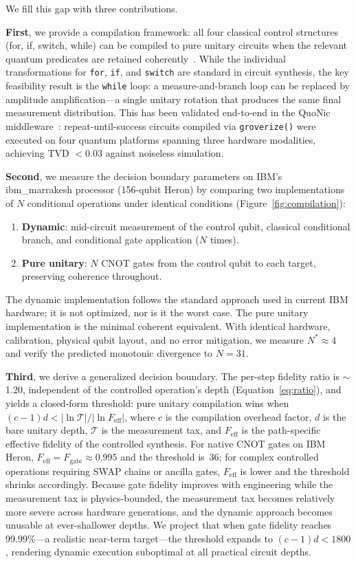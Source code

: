 \documentclass[11pt]{article}
\begin{document}
We fill this gap with three contributions.

\textbf{First}, we provide a compilation framework: all four classical control structures (for, if, switch, while) can be compiled to pure unitary circuits when the relevant quantum predicates are retained coherently~\cite{nielsen2010}.
While the individual transformations for \texttt{for}, \texttt{if}, and \texttt{switch} are standard in circuit synthesis, the key feasibility result is the \texttt{while} loop: a measure-and-branch loop can be replaced by amplitude amplification---a single unitary rotation that produces the same final measurement distribution.
This has been validated end-to-end in the QuoNic middleware~\cite{quonic2026}: repeat-until-success circuits compiled via \texttt{groverize()} were executed on four quantum platforms spanning three hardware modalities, achieving TVD $< 0.03$ against noiseless simulation.

\textbf{Second}, we measure the decision boundary parameters on IBM's ibm\_marrakesh processor (156-qubit Heron) by comparing two implementations of $N$ conditional operations under identical conditions (Figure~\ref{fig:compilation}):
\begin{enumerate}
  \item \textbf{Dynamic}: mid-circuit measurement of the control qubit, classical conditional branch, and conditional gate application ($N$ times).
  \item \textbf{Pure unitary}: $N$ CNOT gates from the control qubit to each target, preserving coherence throughout.
\end{enumerate}
The dynamic implementation follows the standard approach used in current IBM hardware; it is not optimized, nor is it the worst case.
The pure unitary implementation is the minimal coherent equivalent.
With identical hardware, calibration, physical qubit layout, and no error mitigation, we measure $N^* \approx 4$ and verify the predicted monotonic divergence to $N = 31$.

\textbf{Third}, we derive a generalized decision boundary.
The per-step fidelity ratio is $\sim$1.20, independent of the controlled operation's depth (Equation~\ref{eq:ratio}), and yields a closed-form threshold: pure unitary compilation wins when $(c{-}1)d < |\ln\mathcal{T}|/|\ln F_{\text{eff}}|$, where $c$ is the compilation overhead factor, $d$ is the bare unitary depth, $\mathcal{T}$ is the measurement tax, and $F_{\text{eff}}$ is the path-specific effective fidelity of the controlled synthesis.
For native CNOT gates on IBM Heron, $F_{\text{eff}} = F_{\text{gate}} \approx 0.995$ and the threshold is~36; for complex controlled operations requiring SWAP chains or ancilla gates, $F_{\text{eff}}$ is lower and the threshold shrinks accordingly.
Because gate fidelity improves with engineering while the measurement tax is physics-bounded, the measurement tax becomes relatively more severe across hardware generations, and the dynamic approach becomes unusable at ever-shallower depths.
We project that when gate fidelity reaches 99.99\%---a realistic near-term target---the threshold expands to $(c{-}1)d < 1800$, rendering dynamic execution suboptimal at all practical circuit depths.
\end{document}
